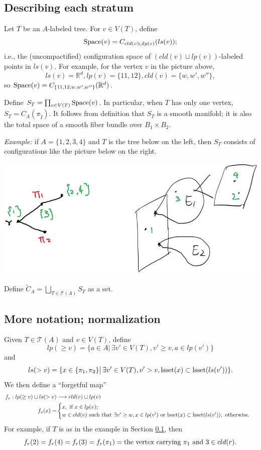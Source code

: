 \documentclass[11pt]{article}
\theoremstyle{definition}
\theoremstyle{remark}
\def\wt#1{\widetilde{#1}}
\def\R{\mathbb{R}}
\def\cT{\mathcal{T}}
\def\rI{{\mathring{I}}}
\def\tn#1{\textnormal{#1}}
\begin{document}
\subsection{Describing each stratum}
\label{stratum2_sec}

Let $T$ be an $A$-labeled tree. 
For $v\in V(T)$, define  
$$\tn{Space}(v)=C_{cld(v)\sqcup lp(v)}(ls(v));$$
i.e., the (uncompactified) configuration space of $(cld(v)\sqcup lp(v))$-labeled points in $ls(v)$. 
For example, for the vertex $v$ in the picture above, $$ls(v)=\R^d, lp(v)=\{11,12\}, cld(v)=\{w,w',w''\},$$
so $\tn{Space}(v)=C_{\{11,12,w,w',w''\}}(\R^d)$. 

Define $S_T=\prod_{v\in V(T)}\tn{Space}(v)$. 
In particular, when $T$ has only one vertex, $S_T=C_A(\pi_\rI)$. 
It follows from definition that $S_T$ is a smooth manifold; it is also the total space of a smooth fiber bundle over $B_1\times B_2$. 

{\it Example:} if $A=\{1,2,3,4\}$ and $T$ is the tree below on the left, then $S_T$ consists of configurations like the picture below on the right. 

\includegraphics[scale=0.5]{ST_fig}

Define $\wt{C}_A=\bigsqcup_{T\in\cT(A)}S_T$ as a set. 

\subsection{More notation; normalization}
\label{normalization_subsec}

Given $T\in\cT(A)$ and $v\in V(T)$, define
$$lp(\ge v)=\{a\in A\big|\,\exists v'\in V(T),v'\ge v, a\in lp(v')\}$$
and 
$$ls(> v)=\{x\in\{\pi_1,\pi_2\}\big|\, \exists v'\in V(T), v'>v, \tn{lsset}(x)\subset\tn{lsset}(ls(v'))\}.$$
We then define a ``forgetful map'' 
\begin{align*}
f_v:lp(\ge v)\sqcup ls(>v)&\longrightarrow cld(v)\sqcup lp(v)\\
f_v(x)=&\begin{cases}x, \tn{ if }x\in lp(v);\\ w\in cld(v) \tn{ such that }\exists v'\ge w, x\in lp(v') \tn{ or }\tn{lsset}(x)\subset\tn{lsset}(ls(v')), \tn{ otherwise}.\end{cases}
\end{align*}
For example, if $T$ is as in the example in Section \ref{stratum2_sec}, then 
$$f_r(2)=f_r(4)=f_r(3)=f_r(\pi_1)=\tn{the vertex carrying }\pi_1 \tn{ and } 3\in cld(r).$$
\end{document}
